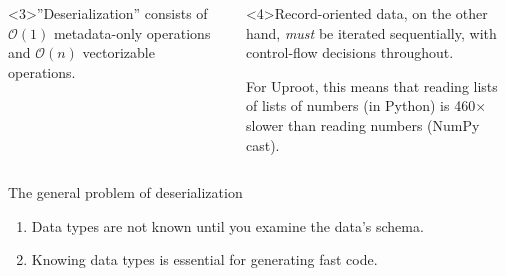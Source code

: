 \documentclass[aspectratio=169]{beamer}
\begin{document}
\begin{frame}{}
\vspace{0.25 cm}

\begin{columns}

\begin{onlyenv}<3>''Deserialization'' consists of $\mathcal{O}(1)$ metadata-only operations and $\mathcal{O}(n)$ vectorizable operations.
\end{onlyenv}\begin{onlyenv}<4>Record-oriented data, on the other hand, {\it must} be iterated sequentially, with control-flow decisions throughout.

\vspace{0.5 cm}
For Uproot, this means that reading lists of lists of numbers (in Python) is 460$\times$ slower than reading numbers (NumPy cast).
\end{onlyenv}
\end{columns}
\end{frame}

\begin{frame}{The general problem of deserialization}
\vspace{0.25 cm}
\Large
\begin{enumerate}
\item Data types are not known until you examine the data's schema.
\item Knowing data types is essential for generating fast code.
\end{enumerate}

\large
\vspace{0.25 cm}
\begin{columns}[t]


\vspace{0.1 cm}

\vspace{0.1 cm}

\vspace{0.1 cm}

\vspace{0.1 cm}
\unco
\end{columns}
\end{frame}
\end{document}
